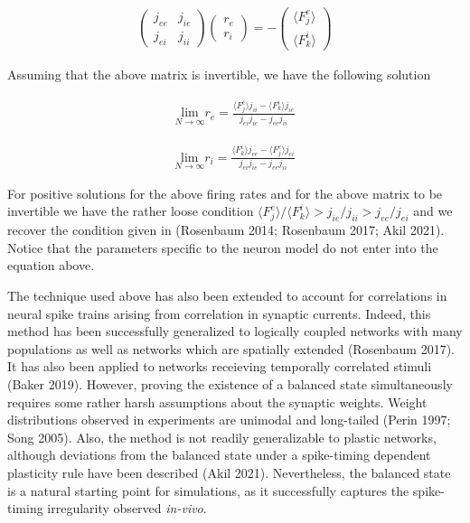 \documentclass{ucetd}
\begin{document}
\begin{align}
\begin{pmatrix}
j_{ee} & j_{ie}\\
j_{ei} & j_{ii}
\end{pmatrix}
\begin{pmatrix}
r_{e}\\
r_{i}
\end{pmatrix}
= 
-\begin{pmatrix}
\langle F_{j}^{e}\rangle\\
\langle F_{k}^{i}\rangle
\end{pmatrix}
\end{align}

Assuming that the above matrix is invertible, we have the following solution

\begin{align}
\underset{N\rightarrow \infty}{\mathrm{lim}}r_{e} = \frac{\langle F_{j}^{e}\rangle j_{ii}-\langle F_{k}^{i}\rangle j_{ie}}{j_{ei}j_{ie} - j_{ee}j_{ii}}
\end{align}

\begin{align}
\underset{N\rightarrow \infty}{\mathrm{lim}}r_{i} = \frac{\langle F_{k}^{i}\rangle j_{ee}-\langle F_{j}^{e}\rangle j_{ei}}{j_{ei}j_{ie} - j_{ee}j_{ii}}
\end{align}

For positive solutions for the above firing rates and for the above matrix to be invertible we have the rather loose condition $\langle F_{j}^{e}\rangle/\langle F_{k}^{i}\rangle > j_{ie}/j_{ii} > j_{ee}/j_{ei}$ and we recover the condition given in (Rosenbaum 2014; Rosenbaum 2017; Akil 2021). Notice that the parameters specific to the neuron model do not enter into the equation above. 

The technique used above has also been extended to account for correlations in neural spike trains arising from correlation in synaptic currents. Indeed, this method has been successfully generalized to logically coupled networks with many populations as well as networks which are spatially extended (Rosenbaum 2017). It has also been applied to networks receieving temporally correlated stimuli (Baker 2019). However, proving the existence of a balanced state simultaneously requires some rather harsh assumptions about the synaptic weights. Weight distributions observed in experiments are unimodal and long-tailed (Perin 1997; Song 2005). Also, the method is not readily generalizable to plastic networks, although deviations from the balanced state under a spike-timing dependent plasticity rule have been described (Akil 2021). Nevertheless, the balanced state is a natural starting point for simulations, as it successfully captures the spike-timing irregularity observed \emph{in-vivo}.
\end{document}
